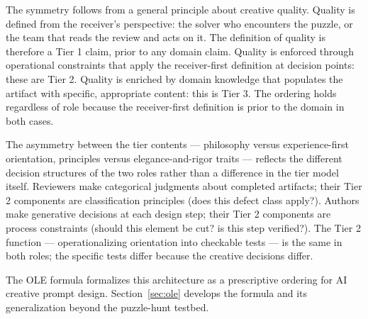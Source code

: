 The symmetry follows from a general principle about creative quality. Quality is
defined from the receiver's perspective: the solver who encounters the puzzle, or the
team that reads the review and acts on it. The definition of quality is therefore a
Tier 1 claim, prior to any domain claim. Quality is enforced through operational
constraints that apply the receiver-first definition at decision points: these are
Tier 2. Quality is enriched by domain knowledge that populates the artifact with
specific, appropriate content: this is Tier 3. The ordering holds regardless of role
because the receiver-first definition is prior to the domain in both cases.

The asymmetry between the tier contents --- philosophy versus experience-first
orientation, principles versus elegance-and-rigor traits --- reflects the different
decision structures of the two roles rather than a difference in the tier model itself.
Reviewers make categorical judgments about completed artifacts; their Tier 2 components
are classification principles (does this defect class apply?). Authors make
generative decisions at each design step; their Tier 2 components are process
constraints (should this element be cut? is this step verified?). The Tier 2 function
--- operationalizing orientation into checkable tests --- is the same in both roles;
the specific tests differ because the creative decisions differ.

The OLE formula formalizes this architecture as a prescriptive ordering for AI
creative prompt design. Section~\ref{sec:ole} develops the formula and its
generalization beyond the puzzle-hunt testbed.
